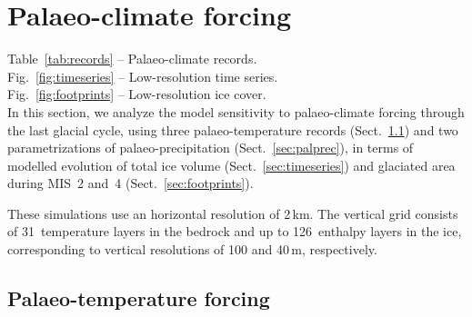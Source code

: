 \documentclass[tc, manuscript]{copernicus}
\begin{document}
\section{Palaeo-climate forcing}
\label{sec:climate}

    Table~\ref{tab:records} -- Palaeo-climate records.\\
    Fig.~\ref{fig:timeseries} -- Low-resolution time series.\\
    Fig.~\ref{fig:footprints} -- Low-resolution ice cover.\\

    In this section, we analyze the model sensitivity to palaeo-climate forcing
    through the last glacial cycle, using three palaeo-temperature records
    (Sect.~\ref{sec:paltemp}) and two parametrizations of palaeo-precipitation
    (Sect.~\ref{sec:palprec}), in terms of modelled evolution of total ice
    volume (Sect.~\ref{sec:timeseries}) and glaciated area during MIS~2 and~4
    (Sect.~\ref{sec:footprints}).

    These simulations use an horizontal resolution of 2\,km. The vertical grid
    consists of 31~temperature layers in the bedrock and up to 126~enthalpy
    layers in the ice, corresponding to vertical resolutions of 100 and
    40\,\unit{m}, respectively.


\subsection{Palaeo-temperature forcing}
\label{sec:paltemp}
\end{document}
